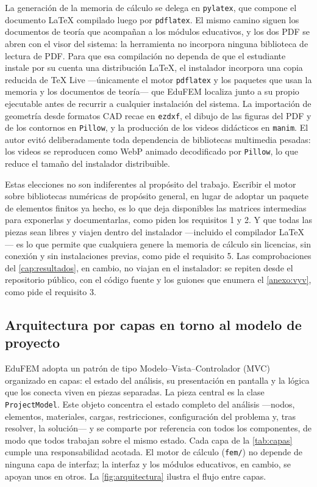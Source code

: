 La generación de la memoria de cálculo se delega en \texttt{pylatex}, que compone el documento \LaTeX{} compilado luego por \texttt{pdflatex}. El mismo camino siguen los documentos de teoría que acompañan a los módulos educativos, y los dos PDF se abren con el visor del sistema: la herramienta no incorpora ninguna biblioteca de lectura de PDF. Para que esa compilación no dependa de que el estudiante instale por su cuenta una distribución \LaTeX{}, el instalador incorpora una copia reducida de \TeX{} Live —únicamente el motor \texttt{pdflatex} y los paquetes que usan la memoria y los documentos de teoría— que EduFEM localiza junto a su propio ejecutable antes de recurrir a cualquier instalación del sistema. La importación de geometría desde formatos CAD recae en \texttt{ezdxf}, el dibujo de las figuras del PDF y de los contornos en \texttt{Pillow}, y la producción de los videos didácticos en \texttt{manim}. El autor evitó deliberadamente toda dependencia de bibliotecas multimedia pesadas: los videos se reproducen como WebP animado decodificado por \texttt{Pillow}, lo que reduce el tamaño del instalador distribuible.

Estas elecciones no son indiferentes al propósito del trabajo. Escribir el motor sobre bibliotecas numéricas de propósito general, en lugar de adoptar un paquete de elementos finitos ya hecho, es lo que deja disponibles las matrices intermedias para exponerlas y documentarlas, como piden los requisitos 1 y 2. Y que todas las piezas sean libres y viajen dentro del instalador —incluido el compilador \LaTeX{}— es lo que permite que cualquiera genere la memoria de cálculo sin licencias, sin conexión y sin instalaciones previas, como pide el requisito 5. Las comprobaciones del \autoref{cap:resultados}, en cambio, no viajan en el instalador: se repiten desde el repositorio público, con el código fuente y los guiones que enumera el \autoref{anexo:vyv}, como pide el requisito 3.

\subsection{Arquitectura por capas en torno al modelo de proyecto}
\label{sec:arquitectura}

EduFEM adopta un patrón de tipo Modelo--Vista--Controlador (MVC) organizado en capas: el estado del análisis, su presentación en pantalla y la lógica que los conecta viven en piezas separadas. La pieza central es la clase \texttt{ProjectModel}. Este objeto concentra el estado completo del análisis —nodos, elementos, materiales, cargas, restricciones, configuración del problema y, tras resolver, la solución— y se comparte por referencia con todos los componentes, de modo que todos trabajan sobre el mismo estado. Cada capa de la \autoref{tab:capas} cumple una responsabilidad acotada. El motor de cálculo (\texttt{fem/}) no depende de ninguna capa de interfaz; la interfaz y los módulos educativos, en cambio, se apoyan unos en otros. La \autoref{fig:arquitectura} ilustra el flujo entre capas.

